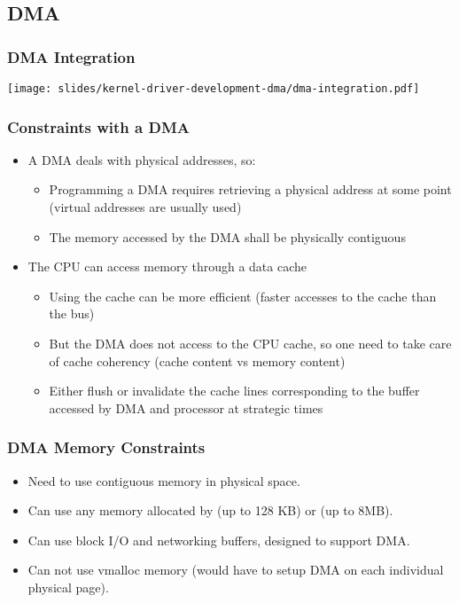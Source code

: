 \subsection{DMA}

\begin{frame}
  \frametitle{DMA Integration}
  \begin{center}
    \texttt{[image: slides/kernel-driver-development-dma/dma-integration.pdf]}
  \end{center}
\end{frame}

\begin{frame}
  \frametitle{Constraints with a DMA}
  \begin{itemize}
  \item A DMA deals with physical addresses, so:
    \begin{itemize}
    \item Programming a DMA requires retrieving a physical address at
      some point (virtual addresses are usually used)
    \item The memory accessed by the DMA shall be physically
      contiguous
    \end{itemize}
  \item The CPU can access memory through a data cache
    \begin{itemize}
    \item Using the cache can be more efficient (faster accesses to
      the cache than the bus)
    \item But the DMA does not access to the CPU cache, so one need to
      take care of cache coherency (cache content vs memory content)
    \item Either flush or invalidate the cache lines corresponding to
      the buffer accessed by DMA and processor at strategic times
    \end{itemize}
  \end{itemize}
\end{frame}

\begin{frame}
  \frametitle{DMA Memory Constraints}
  \begin{itemize}
  \item Need to use contiguous memory in physical space.
  \item Can use any memory allocated by  (up to 128 KB)
    or  (up to 8MB).
  \item Can use block I/O and networking buffers, designed to support
    DMA.
  \item Can not use vmalloc memory (would have to setup DMA on each
    individual physical page).
  \end{itemize}
\end{frame}


